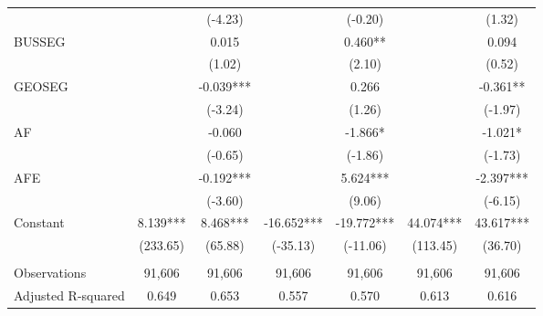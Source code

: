 \begin{table}[H]
\begin{tabular}{lcccccc}
		&   & (-4.23) &   & (-0.20) &   & (1.32) \\
		BUSSEG &   & 0.015 &   & 0.460** &   & 0.094 \\
		&   & (1.02) &   & (2.10) &   & (0.52) \\
		GEOSEG &   & -0.039*** &   & 0.266 &   & -0.361** \\
		&   & (-3.24) &   & (1.26) &   & (-1.97) \\
		AF &   & -0.060 &   & -1.866* &   & -1.021* \\
		&   & (-0.65) &   & (-1.86) &   & (-1.73) \\
		AFE &   & -0.192*** &   & 5.624*** &   & -2.397*** \\
		&   & (-3.60) &   & (9.06) &   & (-6.15) \\
		Constant & 8.139*** & 8.468*** & -16.652*** & -19.772*** & 44.074*** & 43.617*** \\
		& (233.65) & (65.88) & (-35.13) & (-11.06) & (113.45) & (36.70) \\
		&   &   &   &   &   &  \\
		Observations & 91,606 & 91,606 & 91,606 & 91,606 & 91,606 & 91,606 \\
		Adjusted R-squared & 0.649 & 0.653 & 0.557 & 0.570 & 0.613 & 0.616 \\
	\bottomrule
	\bottomrule
	\end{tabular}%
\end{table}%